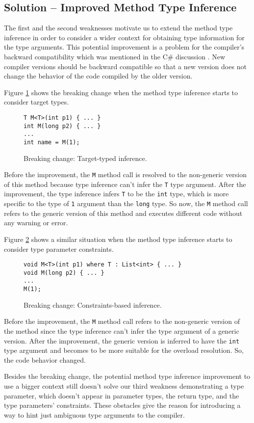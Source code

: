 \subsection{Solution -- Improved Method Type Inference}

The first and the second weaknesses motivate us to extend the method type inference in order to consider a wider context for obtaining type information for the type arguments. 
This potential improvement is a problem for the compiler's backward compatibility which was mentioned in the C\# discussion \cite{online:breakingChange}. 
New compiler versions should be backward compatible so that a new version does not change the behavior of the code compiled by the older version.
\par
Figure \ref{img30:breakingChange1} shows the breaking change when the method type inference starts to consider target types.
\begin{figure}[h]
\begin{lstlisting}[style=csharp]
T M<T>(int p1) { ... }
int M(long p2) { ... }
...
int name = M(1);
\end{lstlisting}
\caption{Breaking change: Target-typed inference.}
\label{img30:breakingChange1}
\end{figure}
\par
Before the improvement, the \texttt{M} method call is resolved to the non-generic version of this method because type inference can’t infer the \texttt{T} type argument. 
After the improvement, the type inference infers \texttt{T} to be the \texttt{int} type, which is more specific to the type of \texttt{1} argument than the \texttt{long} type. 
So now, the \texttt{M} method call refers to the generic version of this method and executes different code without any warning or error.
\par
Figure \ref{img31:breakingChange2} shows a similar situation when the method type inference starts to consider type parameter constraints.
\begin{figure}[h]
\begin{lstlisting}[style=csharp]
void M<T>(int p1) where T : List<int> { ... }
void M(long p2) { ... }
...
M(1);
\end{lstlisting}
\caption{Breaking change: Constraints-based inference.}
\label{img31:breakingChange2}
\end{figure}
\par
Before the improvement, the \texttt{M} method call refers to the non-generic version of the method since the type inference can’t infer the type argument of a generic version. 
After the improvement, the generic version is inferred to have the \texttt{int} type argument and becomes to be more suitable for the overload resolution. 
So, the code behavior changed.
\par
Besides the breaking change, the potential method type inference improvement to use a bigger context still doesn’t solve our third weakness demonstrating a type parameter, which doesn’t appear in parameter types, the return type, and the type parameters’ constraints. 
These obstacles give the reason for introducing a way to hint just ambiguous type arguments to the compiler.

